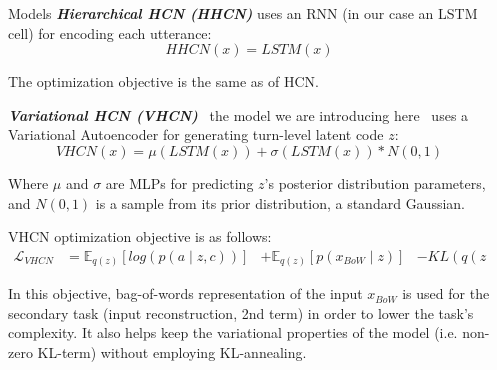 \documentclass[final]{beamer}
\newlength{\sepwidth}
\newlength{\colwidth}
\newlength{\doublecolwidth}
\newcommand{\separatorcolumn}{\begin{column}{\sepwidth}\end{column}}
\begin{document}
\begin{frame}[t]
\begin{columns}[t]
\begin{column}{\doublecolwidth}
\begin{columns}[t,totalwidth=\doublecolwidth]
\begin{column}{\colwidth}
\begin{block}{Models}
\textit{\textbf{Hierarchical HCN (HHCN)}} uses an RNN (in our case an LSTM cell) for encoding each utterance:
\begin{equation} \label{eq:hhcn}
HHCN(x) = LSTM(x)
\end{equation}

The optimization objective is the same as of HCN.

\textit{\textbf{Variational HCN (VHCN)}}~\textemdash{} the model we are introducing here~\textemdash{} uses a Variational Autoencoder for generating turn-level latent code $z$:
\begin{equation}
VHCN(x) = \mu(LSTM(x)) + \sigma(LSTM(x)) * N(0, 1)
\end{equation}
 
Where $\mu$ and $\sigma$ are MLPs for predicting $z$'s posterior distribution parameters, and $N(0, 1)$ is a sample from its prior distribution, a standard Gaussian.
 
VHCN optimization objective is as follows:
\begin{equation} \label{eq:l_vhcn}
\begin{split}
 \mathcal{L}_{VHCN} & = \mathbb{E}_{q(z)}[log(p(a \mid z, c))] & + \mathbb{E}_{q(z)}[p(x_{BoW} \mid z)] & - KL(q(z\mid x) \mid\mid p(z))
 \end{split}
 \end{equation}

In this objective, bag-of-words representation of the input $x_{BoW}$ is used for the secondary task (input reconstruction, 2nd term) in order to lower the task's complexity. It also helps keep the variational properties of the model (i.e. non-zero KL-term) without employing KL-annealing.

\end{block}
\end{column}

\separatorcolumn


\end{columns}
\end{column}
\end{columns}
\end{frame}
\end{document}
